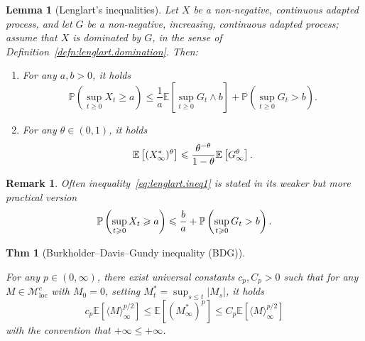 \documentclass[a4paper]{article}
\theoremstyle{mytheoremstyle}
\newtheorem{theorem}{Thm}
\newtheorem{lemma}{Lemma}
\newtheorem*{remark}{Remark}
\newcommand{\1}{\mathds{1}}
\begin{document}
\begin{multicols*}{3}
\begin{unlabeledbox}
\begin{lemma}[Lenglart's inequalities]
  \label{lem:lenglart.ineq}Let $X$ be a non-negative, continuous adapted
  process, and let $G$ be a non-negative, increasing, continuous adapted
  process; assume that $X$ is dominated by $G$, in the sense of
  Definition~\ref{defn:lenglart.domination}. Then:
  \begin{enumerate}
    \item For any $a, b > 0$, it holds
    \begin{equation}
      \mathbb{P} \left(\sup_{t \geqslant 0} X_t \geqslant a \right) \leqslant \frac{1}{a}
      \mathbb{E} \left[\sup_{t \geqslant 0} G_t \wedge b \right] +
      \mathbb{P} \left(\sup_{t \geqslant 0} G_t > b \right) . \label{eq:lenglart.ineq1}
    \end{equation}
    \item For any $\theta \in (0, 1)$, it holds
    \vspace{-0.5em}
    \begin{equation}
      \mathbb{E} \left[(X^{*}_{\infty})^{\theta} \right] \leqslant \frac{\theta^{-
      \theta}}{1 - \theta} \mathbb{E} \left[G_{\infty}^{\theta} \right] .
      \label{eq:lenglart.ineq2}
    \vspace{-0.5em}
    \end{equation}
  \end{enumerate}
\end{lemma}

\begin{remark}
  Often inequality~\eqref{eq:lenglart.ineq1} is stated in its weaker but more
  practical version
    \vspace{-0.5em}
  \begin{equation}
    \mathbb{P} \left(\sup_{t \geqslant 0} X_t \geqslant a \right) \leqslant
    \frac{b}{a} +\mathbb{P} \left(\sup_{t \geqslant 0} G_t > b \right) . \label{eq:lenglart.ineq1bis}
    \vspace{-0.5em}
  \end{equation}
\end{remark}

\begin{theorem}[Burkholder--Davis--Gundy inequality (BDG)]
  \label{thm:BDG}
  
  For any $p \in (0, \infty)$, there exist universal constants $c_p, C_p > 0$
  such that for any $M \in \mathcal{M}^c_{\operatorname{loc}}$ with $M_0 = 0$, setting
  $M^{*}_t = \sup_{s \leqslant t}  | M_s |$, it holds
  \begin{equation}
    c_p \mathbb{E} \left[\langle M \rangle_{\infty}^{p / 2} \right] \leqslant
    \mathbb{E} \left[(M^{*}_{\infty})^p \right] \leqslant
    C_p \mathbb{E} \left[ \langle M \rangle_{\infty}^{p / 2} \right] \label{eq:BDG}
  \end{equation}
  with the convention that $+ \infty \leqslant + \infty$.
\end{theorem}
\end{unlabeledbox}


\end{multicols*}
\end{document}
